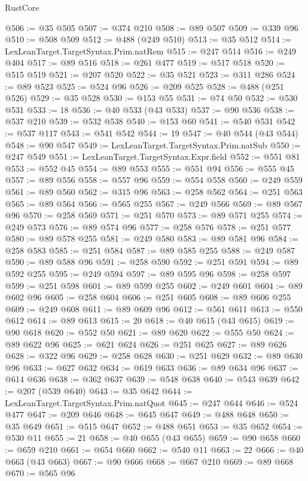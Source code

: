\begin{lexlean}{RustCore}
\begin{coremodule}
@506 := @35 @505
@507 := @374 @210
@508 := @89 @507
@509 := @339 @96
@510 := @508 @509
@512 := @488 (@249 @510)
@513 := @35 @512
@514 := LexLeanTarget.TargetSyntax.Prim.natRem
@515 := @247 @514
@516 := @249 @404
@517 := @89 @516
@518 := @261 @477
@519 := @517 @518
@520 := @515 @519
@521 := @207 @520
@522 := @35 @521
@523 := @311 @286
@524 := @89 @523
@525 := @524 @96
@526 := @209 @525
@528 := @488 (@251 @526)
@529 := @35 @528
@530 := @153 @55
@531 := @74 @50
@532 := @530 @531
@533 := 18
@536 := @40 @533 (@43 @533)
@537 := @90 @536
@538 := @537 @210
@539 := @532 @538
@540 := @153 @60
@541 := @540 @531
@542 := @537 @117
@543 := @541 @542
@544 := 19
@547 := @40 @544 (@43 @544)
@548 := @90 @547
@549 := LexLeanTarget.TargetSyntax.Prim.natSub
@550 := @247 @549
@551 := LexLeanTarget.TargetSyntax.Expr.field
@552 := @551 @81
@553 := @552 @45
@554 := @89 @553
@555 := @551 @94
@556 := @555 @45
@557 := @89 @556
@558 := @557 @96
@559 := @554 @558
@560 := @249 @559
@561 := @89 @560
@562 := @315 @96
@563 := @258 @562
@564 := @251 @563
@565 := @89 @564
@566 := @565 @255
@567 := @249 @566
@569 := @89 @567 @96
@570 := @258 @569
@571 := @251 @570
@573 := @89 @571 @255
@574 := @249 @573
@576 := @89 @574 @96
@577 := @258 @576
@578 := @251 @577
@580 := @89 @578 @255
@581 := @249 @580
@583 := @89 @581 @96
@584 := @258 @583
@585 := @251 @584
@587 := @89 @585 @255
@588 := @249 @587
@590 := @89 @588 @96
@591 := @258 @590
@592 := @251 @591
@594 := @89 @592 @255
@595 := @249 @594
@597 := @89 @595 @96
@598 := @258 @597
@599 := @251 @598
@601 := @89 @599 @255
@602 := @249 @601
@604 := @89 @602 @96
@605 := @258 @604
@606 := @251 @605
@608 := @89 @606 @255
@609 := @249 @608
@611 := @89 @609 @96
@612 := @561 @611
@613 := @550 @612
@614 := @89 @613
@615 := 20
@618 := @40 @615 (@43 @615)
@619 := @90 @618
@620 := @552 @50
@621 := @89 @620
@622 := @555 @50
@624 := @89 @622 @96
@625 := @621 @624
@626 := @251 @625
@627 := @89 @626
@628 := @322 @96
@629 := @258 @628
@630 := @251 @629
@632 := @89 @630 @96
@633 := @627 @632
@634 := @619 @633
@636 := @89 @634 @96
@637 := @614 @636
@638 := @362 @637
@639 := @548 @638
@640 := @543 @639
@642 := @207 (@539 @640)
@643 := @35 @642
@644 := LexLeanTarget.TargetSyntax.Prim.natQuot
@645 := @247 @644
@646 := @524 @477
@647 := @209 @646
@648 := @645 @647
@649 := @488 @648
@650 := @35 @649
@651 := @515 @647
@652 := @488 @651
@653 := @35 @652
@654 := @530 @11
@655 := 21
@658 := @40 @655 (@43 @655)
@659 := @90 @658
@660 := @659 @210
@661 := @654 @660
@662 := @540 @11
@663 := 22
@666 := @40 @663 (@43 @663)
@667 := @90 @666
@668 := @667 @210
@669 := @89 @668
@670 := @565 @96

\end{coremodule}
\end{lexlean}
